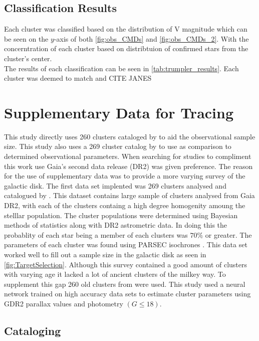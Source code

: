 \subsection{Classification Results}

Each cluster was classified based on the distribution of V magnitude which can be seen on the $y$-axis of both \cref{fig:obs_CMDs} and \cref{fig:obs_CMDs_2}. With the concerntration of each cluster based on distribtuion of confirmed stars from the cluster's center. \\ 
The results of each classification can be seen in \cref{tab:trumpler_results}. Each cluster was deemed to match \cite{1981ADCBu...1...90L} and CITE JANES

\section{Supplementary Data for Tracing} \label{sec:supplementary_data}

This study directly uses 260 clusters cataloged by \cite{2020A&A...640A...1C} to aid the observational sample size. This study also uses a 269 cluster catalog by \cite{2019A&A...623A.108B} to use as comparison to determined observational parameters. When searching for studies to compliment this work use Gaia's second data release (DR2) was given preference. The reason for the use of supplementary data was to provide a more varying survey of the galactic disk. The first data set implented was 269 clusters analysed and catalogued by \cite{2019A&A...623A.108B}. This dataset contains large sample of clusters analysed from Gaia DR2, with each of the clusters containg a high degree homogenity amoung the stelllar population. The cluster populations were determined using Bayesian methods of statistics along with DR2 astrometric data. In doing this the probablity of each star being a member of each clusters was $70\%$ or greater. The parameters of each cluster was found using PARSEC isochrones \citep{2012MNRAS.427..127B}. This data set worked well to fill out a sample size in the galactic disk as seen in \cref{fig:TargetSelection}. Although this survey contained a good amount of clusters with varying age it lacked a lot of ancient clusters of the milkey way. To supplement this gap 260 old clusters from \cite{2020A&A...640A...1C} were used. This study used a neural network trained on high accuracy data sets to estimate cluster parameters using GDR2 parallax values and photometry $(G \leq 18)$. 

\subsection{Cataloging}

